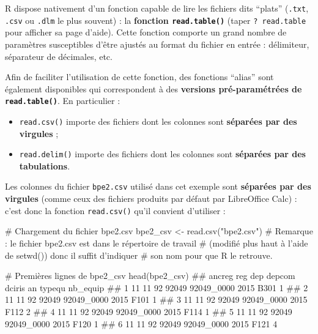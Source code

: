 \documentclass[12pt,twosided, notitlepage]{book}
\newenvironment{Shaded}{}{}
\newcommand{\KeywordTok}[1]{\textcolor[rgb]{0.00,0.00,1.00}{#1}}
\newcommand{\StringTok}[1]{\textcolor[rgb]{0.00,0.50,0.50}{#1}}
\newcommand{\CommentTok}[1]{\textcolor[rgb]{0.00,0.50,0.00}{#1}}
\newcommand{\NormalTok}[1]{#1}
\providecommand{\tightlist}{%
  \setlength{\itemsep}{0pt}\setlength{\parskip}{0pt}}
\renewenvironment{Shaded}{\begin{snugshade}}{\end{snugshade}}
\begin{document}
R dispose nativement d'un fonction capable de lire les fichiers dits
\enquote{plats} (\texttt{.txt}, \texttt{.csv} ou \texttt{.dlm} le plus
souvent) : la \textbf{fonction
\texttt{read.table()}} (taper
\texttt{?\ read.table} pour afficher sa page d'aide). Cette fonction
comporte un grand nombre de paramètres susceptibles d'être ajustés au
format du fichier en entrée : délimiteur, séparateur de décimales, etc.

Afin de faciliter l'utilisation de cette fonction, des fonctions
\enquote{alias} sont également disponibles qui correspondent à des
\textbf{versions pré-paramétrées de \texttt{read.table()}}. En
particulier :

\begin{itemize}
\tightlist
\item
  \texttt{read.csv()} importe des
  fichiers dont les colonnes sont \textbf{séparées par des virgules} ;
\item
  \texttt{read.delim()} importe des
  fichiers dont les colonnes sont \textbf{séparées par des tabulations}.
\end{itemize}

Les colonnes du fichier \texttt{bpe2.csv} utilisé dans cet exemple sont
\textbf{séparées par des virgules} (comme ceux des fichiers produits par
défaut par LibreOffice Calc) : c'est donc la fonction
\texttt{read.csv()} qu'il convient d'utiliser :

\begin{Shaded}
\begin{Highlighting}[]
\CommentTok{# Chargement du fichier bpe2.csv}
\NormalTok{bpe2_csv <-}\StringTok{ }\KeywordTok{read.csv}\NormalTok{(}\StringTok{"bpe2.csv"}\NormalTok{)}
\CommentTok{# Remarque : le fichier bpe2.csv est dans le répertoire de travail}
\CommentTok{# (modifié plus haut à l'aide de setwd()) donc il suffit d'indiquer }
\CommentTok{# son nom pour que R le retrouve. }

\CommentTok{# Premières lignes de bpe2_csv}
\KeywordTok{head}\NormalTok{(bpe2_csv)}
\NormalTok{  ##   ancreg reg dep depcom     dciris   an typequ nb_equip}
\NormalTok{  ## 1     11  11  92  92049 92049_0000 2015   B301        1}
\NormalTok{  ## 2     11  11  92  92049 92049_0000 2015   F101        1}
\NormalTok{  ## 3     11  11  92  92049 92049_0000 2015   F112        2}
\NormalTok{  ## 4     11  11  92  92049 92049_0000 2015   F114        1}
\NormalTok{  ## 5     11  11  92  92049 92049_0000 2015   F120        1}
\NormalTok{  ## 6     11  11  92  92049 92049_0000 2015   F121        4}
\end{Highlighting}
\end{Shaded}
\end{document}
